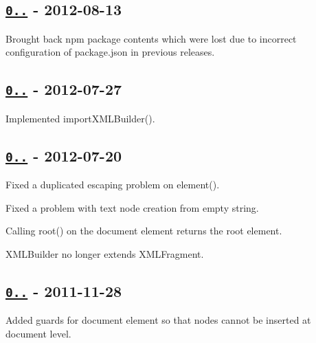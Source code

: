 \subsection*{\href{https://github.com/oozcitak/xmlbuilder-js/compare/v0.3.3...v0.3.10}{\tt 0..} -\/ 2012-\/08-\/13}


\begin{DoxyItemize}
\item Brought back npm package contents which were lost due to incorrect configuration of {\ttfamily package.\+json} in previous releases.
\end{DoxyItemize}

\subsection*{\href{https://github.com/oozcitak/xmlbuilder-js/compare/v0.3.2...v0.3.3}{\tt 0..} -\/ 2012-\/07-\/27}


\begin{DoxyItemize}
\item Implemented {\ttfamily import\+X\+M\+L\+Builder()}.
\end{DoxyItemize}

\subsection*{\href{https://github.com/oozcitak/xmlbuilder-js/compare/v0.3.1...v0.3.2}{\tt 0..} -\/ 2012-\/07-\/20}


\begin{DoxyItemize}
\item Fixed a duplicated escaping problem on {\ttfamily element()}.
\item Fixed a problem with text node creation from empty string.
\item Calling {\ttfamily root()} on the document element returns the root element.
\item {\ttfamily X\+M\+L\+Builder} no longer extends {\ttfamily X\+M\+L\+Fragment}.
\end{DoxyItemize}

\subsection*{\href{https://github.com/oozcitak/xmlbuilder-js/compare/v0.3.0...v0.3.1}{\tt 0..} -\/ 2011-\/11-\/28}


\begin{DoxyItemize}
\item Added guards for document element so that nodes cannot be inserted at document level.
\end{DoxyItemize}

